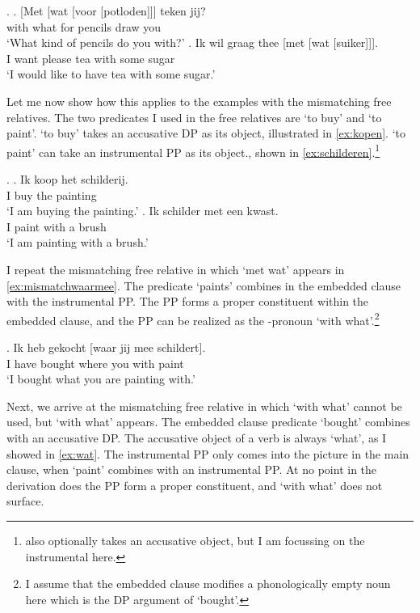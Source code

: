 \documentclass[12pt]{article}
\begin{document}
\ex.\label{ex:moremetwat}
\ag. [Met [wat [voor [potloden]]] teken jij?\\
 with what for pencils draw you\\
 `What kind of pencils do you with?'\label{ex:watwasfur}
\bg. Ik wil graag thee [met [wat [suiker]]].\\
 I want please tea with some sugar\\
 `I would like to have tea with some sugar.'\label{ex:watindef}

Let me now show how this applies to the examples with the mismatching free relatives. The two predicates I used in the free relatives are  `to buy' and   `to paint'.  `to buy' takes an accusative DP as its object, illustrated in \ref{ex:kopen}.  `to paint' can take an instrumental PP as its object., shown in \ref{ex:schilderen}.\footnote{ also optionally takes an accusative object, but I am focussing on the instrumental here.}

\ex.
\ag. Ik koop het schilderij.\\
 I buy the painting\\
 `I am buying the painting.'\label{ex:kopen}
\bg. Ik schilder met een kwast.\\
 I paint with a brush\\
 `I am painting with a brush.'\label{ex:schilderen}

I repeat the mismatching free relative in which  `met wat' appears in \ref{ex:mismatchwaarmee}. The predicate  `paints' combines in the embedded clause with the instrumental PP. The PP forms a proper constituent within the embedded clause, and the PP can be realized as the -pronoun  `with what'.\footnote{I assume that the embedded clause modifies a phonologically empty noun here which is the DP argument of  `bought'.}

\exg. Ik heb gekocht [waar jij mee schildert].\\
 I have bought where you with paint\\
 `I bought what you are painting with.'\label{ex:mismatchwaarmee}

Next, we arrive at the mismatching free relative in which  `with what' cannot be used, but  `with what' appears. The embedded clause predicate  `bought' combines with an accusative DP. The accusative object of a verb is always  `what', as I showed in \ref{ex:wat}. The instrumental PP only comes into the picture in the main clause, when  `paint' combines with an instrumental PP. At no point in the derivation does the PP form a proper constituent, and  `with what' does not surface.
\end{document}
